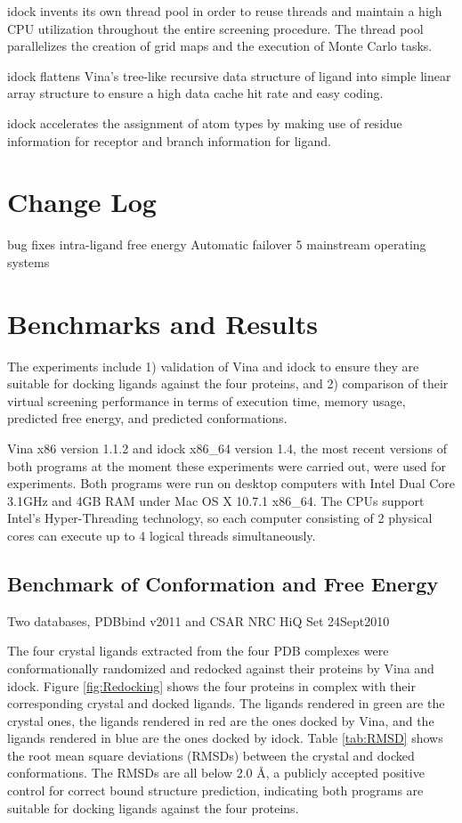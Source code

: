 \documentclass[10pt,conference,compsocconf]{../IEEEtran}
\begin{document}
idock invents its own thread pool in order to reuse threads and maintain a high CPU utilization throughout the entire screening procedure. The thread pool parallelizes the creation of grid maps and the execution of Monte Carlo tasks.

idock flattens Vina's tree-like recursive data structure of ligand into simple linear array structure to ensure a high data cache hit rate and easy coding.

idock accelerates the assignment of atom types by making use of residue information for receptor and branch information for ligand.

\section{Change Log}

bug fixes
intra-ligand free energy
Automatic failover
5 mainstream operating systems

\section{Benchmarks and Results}

The experiments include 1) validation of Vina and idock to ensure they are suitable for docking ligands against the four proteins, and 2) comparison of their virtual screening performance in terms of execution time, memory usage, predicted free energy, and predicted conformations.

Vina x86 version 1.1.2 and idock x86\_64 version 1.4, the most recent versions of both programs at the moment these experiments were carried out, were used for experiments. Both programs were run on desktop computers with Intel Dual Core 3.1GHz and 4GB RAM under Mac OS X 10.7.1 x86\_64. The CPUs support Intel's Hyper-Threading technology, so each computer consisting of 2 physical cores can execute up to 4 logical threads simultaneously.

\subsection{Benchmark of Conformation and Free Energy}

Two databases, PDBbind v2011 and CSAR NRC HiQ Set 24Sept2010

The four crystal ligands extracted from the four PDB complexes were conformationally randomized and redocked against their proteins by Vina and idock. Figure \ref{fig:Redocking} shows the four proteins in complex with their corresponding crystal and docked ligands. The ligands rendered in green are the crystal ones, the ligands rendered in red are the ones docked by Vina, and the ligands rendered in blue are the ones docked by idock. Table \ref{tab:RMSD} shows the root mean square deviations (RMSDs) between the crystal and docked conformations. The RMSDs are all below 2.0 \AA, a publicly accepted positive control for correct bound structure prediction, indicating both programs are suitable for docking ligands against the four proteins.
\end{document}
